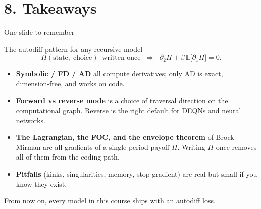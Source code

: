 \documentclass[aspectratio=169,11pt]{beamer}
\newcommand{\emphc}[1]{\textcolor{harvardcrimson}{#1}}
\begin{document}

\section*{8. Takeaways}

\begin{frame}{One slide to remember}
\small
\begin{block}{The autodiff pattern for any recursive model}
\[
\boxed{\;\Pi(\text{state},\;\text{choice}) \;\;\text{written once} \;\; \Longrightarrow \;\; \partial_2 \Pi + \beta\, \mathbb{E}\bigl[\partial_1 \Pi\bigr] = 0.\;}
\]
\end{block}
\vspace{4pt}
\begin{itemize}\itemsep3pt
\item \textbf{Symbolic / FD / AD} all compute derivatives; only AD is exact, dimension-free, and works on code.
\item \textbf{Forward vs reverse mode} is a choice of traversal direction on the computational graph. Reverse is the right default for DEQNs and neural networks.
\item \textbf{The Lagrangian, the FOC, and the envelope theorem} of Brock--Mirman are all gradients of a single period payoff $\Pi$. Writing $\Pi$ once removes all of them from the coding path.
\item \textbf{Pitfalls} (kinks, singularities, memory, stop-gradient) are real but small if you know they exist.
\end{itemize}
\vspace{4pt}
\centerline{\emphc{From now on, every model in this course ships with an autodiff loss.}}
\end{frame}
\end{document}

